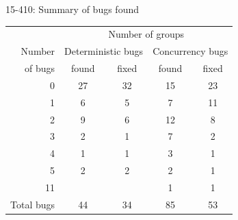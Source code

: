 \documentclass[xcolor=dvipsnames]{beamer}
\begin{document}
\begin{frame}{15-410: Summary of bugs found}
	\begin{center}
	\begin{tabular}{r|cc|cc}
	& \multicolumn{4}{c}{Number of groups} \\
	Number & \multicolumn{2}{c|}{Deterministic bugs} & \multicolumn{2}{c}{Concurrency bugs} \\
	of bugs & found & fixed & found & fixed \\
	\hline
	0       & 27    & 32    & 15    & 23    \\
	1       & 6     & 5     & 7     & 11    \\
	2       & 9     & 6     & 12    & 8     \\
	3       & 2     & 1     & 7     & 2     \\
	4       & 1     & 1     & 3     & 1     \\
	5       & 2     & 2     & 2     & 1     \\
	11      &       &       & 1     & 1     \\
	\hline
	Total bugs
		& 44    & 34    & 85    & 53    \\
	\end{tabular}
	\end{center}

\end{frame}
\end{document}
